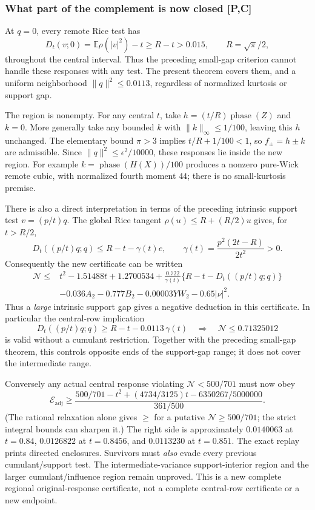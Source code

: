 \subsubsection{What part of the complement is now closed [P,C]}
At $q=0$, every remote Rice test has
\[
 D_t(v;0)=\mathbb E\rho(|v|^2)-t\ge R-t>0.015,
 \qquad R=\sqrt\pi/2,
\]
throughout the central interval. Thus the preceding small-gap criterion
cannot handle these responses with any test. The present theorem covers
them, and a uniform neighborhood $\|q\|^2\le0.0113$, regardless of
normalized kurtosis or support gap.

The region is nonempty. For any central $t$, take
$h=(t/R)\operatorname{phase}(Z)$ and $k=0$. More generally take any
bounded $k$ with $\|k\|_\infty\le1/100$, leaving this $h$ unchanged.
The elementary bound $\pi>3$ implies $t/R+1/100<1$, so $f_\pm=h\pm k$
are admissible. Since $\|q\|^2\le\epsilon^2/10000$, these responses lie
inside the new region. For example $k=\operatorname{phase}(H(X))/100$
produces a nonzero pure-Wick remote cubic, with normalized fourth moment
$44$; there is no small-kurtosis premise.

There is also a direct interpretation in terms of the preceding intrinsic
support test $v=(p/t)q$. The global Rice tangent
$\rho(u)\le R+(R/2)u$ gives, for $t>R/2$,
\[
 D_t((p/t)q;q)\le R-t-\gamma(t)e,\qquad
 \gamma(t)=\frac{p^2(2t-R)}{2t^2}>0.
\]
Consequently the new certificate can be written
\[
\begin{aligned}
 \mathcal N\le{}&t^2-1.51488t+1.2700534
 +\frac{0.722}{\gamma(t)}\{R-t-D_t((p/t)q;q)\}\\
 &-0.036A_2-0.777B_2-0.00003YW_2-0.65|\nu|^2.
\end{aligned}
\]
Thus a \emph{large} intrinsic support gap gives a negative deduction in
this certificate. In particular the central-row implication
\[
 D_t((p/t)q;q)\ge R-t-0.0113\,\gamma(t)
 \quad\Longrightarrow\quad \mathcal N\le0.71325012
\]
is valid without a cumulant restriction. Together with the preceding
small-gap theorem, this controls opposite ends of the support-gap range;
it does not cover the intermediate range.

Conversely any actual central response violating $\mathcal N<500/701$
must now obey
\begin{equation}\label{eq:sio-survivor}
 \boxed{\quad
 \mathcal E_{\mathrm{adj}}\ge
 \frac{500/701-t^2+(4734/3125)t-6350267/5000000}{361/500}.
 \quad}
\end{equation}
(The rational relaxation alone gives $\ge$ for a putative $\mathcal N\ge
500/701$; the strict integral bounds can sharpen it.) The right side is
approximately $0.0140063$ at $t=0.84$, $0.0126822$ at $t=0.8456$, and
$0.0113230$ at $t=0.851$. The exact replay prints directed enclosures.
Survivors must \emph{also} evade every previous cumulant/support test.
The intermediate-variance support-interior region and the larger
cumulant/influence region remain unproved. This is a new complete
regional original-response certificate, not a complete central-row
certificate or a new endpoint.

